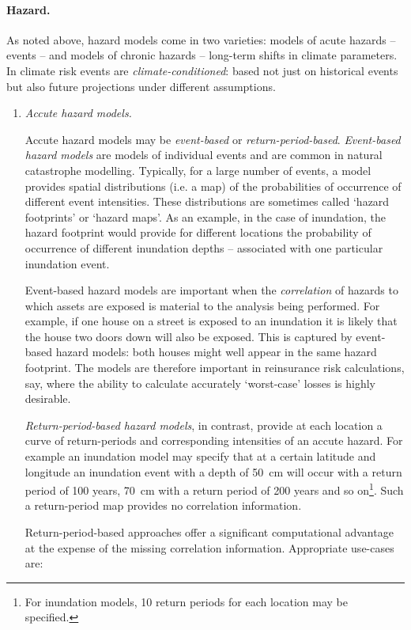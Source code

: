 \documentclass[a4paper,11pt]{extarticle} %
\theoremstyle{definition}
\begin{document}
\paragraph{Hazard.}
As noted above, hazard models come in two varieties: models of acute hazards -- events -- and models of chronic hazards -- long-term shifts in climate parameters. In climate risk events are \emph{climate-conditioned}: based not just on historical events but also future projections under different assumptions.
\begin{enumerate}[label=\Alph*.]
\item{\emph{Accute hazard models.}}

Accute hazard models may be \emph{event-based} or \emph{return-period-based}.
\emph{Event-based hazard models} are models of individual events and are common in natural catastrophe modelling. Typically, for a large number of events, a model provides spatial distributions (i.e. a map) of the probabilities of occurrence of different event intensities. These distributions are sometimes called `hazard footprints' \cite{OasisFinancialModule} or `hazard maps'. As an example, in the case of inundation, the hazard footprint would provide for different locations the probability of occurrence of different inundation depths -- associated with one particular inundation event.

Event-based hazard models are important when the \emph{correlation} of hazards to which assets are exposed is material to the analysis being performed. For example, if one house on a street is exposed to an inundation it is likely that the house two doors down will also be exposed. This is captured by event-based hazard models: both houses might well appear in the same hazard footprint. The models are therefore important in reinsurance risk calculations, say, where the ability to calculate accurately `worst-case' losses is highly desirable.

\emph{Return-period-based hazard models}, in contrast, provide at each location a curve of return-periods and corresponding intensities of an accute hazard. For example an inundation model may specify that at a certain latitude and longitude an inundation event with a depth of 50~cm will occur with a return period of 100 years, 70~cm with a return period of 200 years and so on\footnote{For inundation models, 10 return periods for each location may be specified.}. Such a return-period map provides no correlation information.

Return-period-based approaches offer a significant computational advantage at the expense of the missing correlation information. Appropriate use-cases are:


\end{enumerate}
\end{document}
